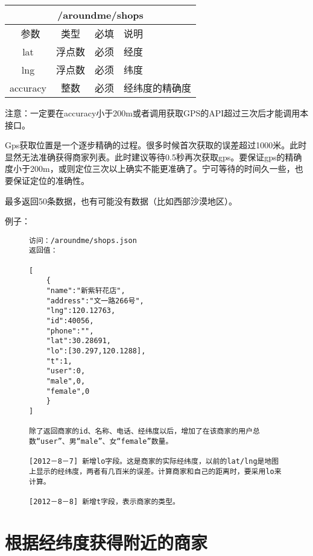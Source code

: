 \documentclass[cs4size]{ctexartutf8}
\begin{document}
\begin{table}[H]
   \begin{center}
\begin{tabular}{|c|c|c|p{12cm}|}
\hline
\multicolumn{4}{|c|}{/aroundme/shops} \\
\hline\hline
 \  参数  & 类型 & 必填 &  说明  \\
\hline
 lat  & 浮点数 & 必须 & 经度\\
\hline
 lng  &  浮点数 & 必须 & 纬度\\ 
\hline
 accuracy  & 整数 & 必须 & 经纬度的精确度\\ 
\hline
\end{tabular}
   \end{center}
\end{table}

注意：一定要在accuracy小于200m或者调用获取GPS的API超过三次后才能调用本接口。

Gps获取位置是一个逐步精确的过程。很多时候首次获取的误差超过1000米。此时显然无法准确获得商家列表。此时建议等待0.5秒再次获取gps。要保证gps的精确度小于200m，或则定位三次以上确实不能更准确了。宁可等待的时间久一些，也要保证定位的准确性。

最多返回50条数据，也有可能没有数据（比如西部沙漠地区）。

例子：

\begin{figure}[H]
\begin{verbatim}
访问：/aroundme/shops.json
返回值：

[
	{
	"name":"新紫轩花店",
	"address":"文一路266号",
	"lng":120.12763,
	"id":40056,
	"phone":"",
	"lat":30.28691,
	"lo":[30.297,120.1288],
	"t":1,
	"user":0,
	"male",0,
	"female",0
	}
]

除了返回商家的id、名称、电话、经纬度以后，增加了在该商家的用户总数“user”、男“male”、女“female”数量。

[2012－8－7] 新增lo字段。这是商家的实际经纬度，以前的lat/lng是地图上显示的经纬度，两者有几百米的误差。计算商家和自己的距离时，要采用lo来计算。

[2012－8－8] 新增t字段，表示商家的类型。

\end{verbatim}
\end{figure}



\section{根据经纬度获得附近的商家}
\end{document}
